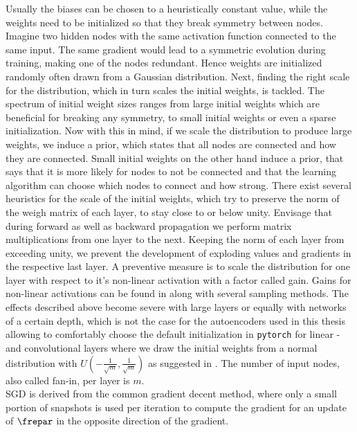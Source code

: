 Usually the biases can be chosen to a heuristically constant value, while the weights need to be initialized so that they break symmetry between nodes. Imagine two hidden nodes with the same activation function connected to the same input. The same gradient would lead to a symmetric evolution during training, making one of the nodes redundant. Hence weights are initialized randomly often drawn from a Gaussian distribution. Next, finding the right scale for the distribution, which in turn scales the initial weights, is tackled. The spectrum of initial weight sizes ranges from large initial weights which are beneficial for breaking any symmetry, to small initial weights or even a sparse initialization. Now with this in mind, if we scale the distribution to produce large weights, we induce a prior, which states that all nodes are connected and how they are connected. Small initial weights on the other hand induce a prior, that says that it is more likely for nodes to not be connected and that the learning algorithm can choose which nodes to connect and how strong. There exist several heuristics for the scale of the initial weights, which try to preserve the norm of the weigh matrix of each layer, to stay close to or below unity. Envisage that during forward as well as backward propagation we perform matrix multiplications from one layer to the next. Keeping the norm of each layer from exceeding unity, we prevent the development of exploding values and gradients in the respective last layer. A preventive measure is to scale the distribution for one layer with respect to it's non-linear activation with a factor called gain. Gains for non-linear activations can be found in \cite{torch_ini} along with several sampling methods. The effects described above become severe with large layers or equally with networks of a certain depth, which is not the case for the autoencoders used in this thesis allowing to comfortably choose the default initialization in \texttt{pytorch} for linear -and convolutional layers where we draw the initial weights from a normal distribution with \(U(-\frac{1}{\sqrt{m}},\frac{1}{\sqrt{m}})\) as suggested in \cite{LeCun98}. The number of input nodes, also called fan-in, per layer is \(m\).\\
SGD is derived from the common gradient decent method, where only a small portion of snapshots is used per iteration to compute the gradient for an update of \(\frepar\) in the opposite direction of the gradient. \\

